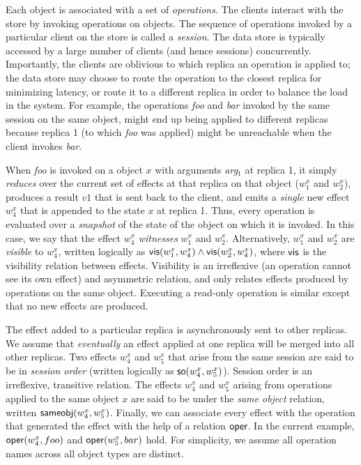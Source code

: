 Each object is associated with a set of \emph{operations}. The clients
interact with the store by invoking operations on objects. The sequence of
operations invoked by a particular client on the store is called a
\emph{session}. The data store is typically accessed by a large number of
clients (and hence sessions) concurrently. Importantly, the clients are
oblivious to which replica an operation is applied to; the data store may
choose to route the operation to the closest replica for minimizing latency,
or route it to a different replica in order to balance the load in the
system. For example, the operations \emph{foo} and \emph{bar} invoked by the same
session on the same object, might end up being applied to different replicas
because replica 1 (to which \emph{foo} was applied) might be unreachable when
the client invokes \emph{bar}.

When \emph{foo} is invoked on a object $x$ with arguments \emph{arg}$_1$ at
replica 1, it simply \emph{reduces} over the current set of
effects at that replica on that object ($w^x_1$ and $w^x_2$), produces a result
$v1$ that is sent back to the client, and emits a \emph{single} new effect
$w^x_4$ that is appended to the state $x$ at replica 1. Thus, every operation
is evaluated over a \emph{snapshot} of the state of the object on which it is
invoked. In this case, we say that the effect $w^x_4$ \emph{witnesses} $w^x_1$
and $w^x_2$. Alternatively, $w^x_1$ and $w^x_2$ are \emph{visible} to $w^x_4$,
written logically as ${\normalfont \textsf{vis}(w^x_1,w^x_4)} \wedge {\normalfont \textsf{vis}(w^x_2,w^x_4)}$, where
${\normalfont \textsf{vis}}$ is the visibility relation between effects. Visibility is an
irreflexive (an operation cannot see its own effect) and asymmetric relation,
and only relates effects produced by operations on the same object.
Executing a read-only operation is similar except
that no new effects are produced.

The effect added to a particular replica is asynchronously sent to other
replicas. We assume that \emph{eventually} an effect applied at one replica
will be merged into all other replicas. Two effects $w^x_4$ and $w^x_5$ that
arise from the same session are said to be in \emph{session order} (written
logically as ${\normalfont \textsf{so}(w^x_4,w^x_5)}$). Session order is an irreflexive,
transitive relation. The effects $w^x_4$ and $w^x_5$ arising from operations
applied to the same object $x$ are said to be under the \emph{same object}
relation, written ${\normalfont \textsf{sameobj}(w^x_4,w^x_5)}$. Finally, we can associate every
effect with the operation that generated the effect with the help of a
relation ${\normalfont \textsf{oper}}$. In the current example, ${\normalfont \textsf{oper}(w^x_4,foo)}$ and
${\normalfont \textsf{oper}(w^x_5,bar)}$ hold. For simplicity, we assume all operation names
across all object types are distinct.

